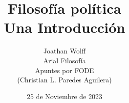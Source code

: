 \title{
  \textbf{Filosofía política} \\
  \large Una Introducción
}

\author{
  Joathan Wolff \\
  \vspace{1cm}
  \small Arial Filosofía \\
  Apuntes por FODE\\
  \small(Christian L. Paredes Aguilera)
}

\date{25 de Noviembre de 2023}
